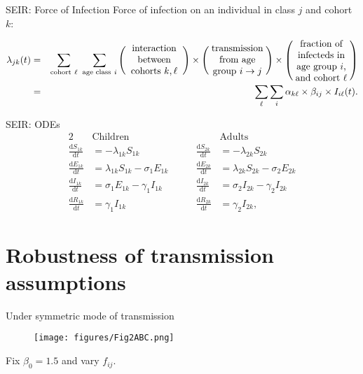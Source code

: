 \documentclass[8pt]{beamer}
\newcommand{\ddt}[1]{\frac{\mathrm{d}#1}{\mathrm{d}t}}
\begin{document}
\begin{frame}{SEIR: Force of Infection}
Force of infection on an individual in class $j$ and cohort $k$:

\begin{eqnarray*}
    \lambda_{jk}(t) &=&
    \sum_{\text{cohort}~\ell}~\sum_{\text{age class}~i}
    \left(\parbox{6em}{\centering interaction between cohorts $k,\ell$}\right)
    \times
    \left(\parbox{6em}{\centering transmission from age group $i \rightarrow j$}\right)
    \times
    \left(\parbox{6em}{\centering fraction of infecteds in age group $i$, and cohort $\ell$}\right) \\
    &=&
    \sum_{\ell} \sum_{i}
    \alpha_{k\ell}
    \times
    \beta_{ij}
    \times
    I_{i\ell}(t).
    \end{eqnarray*}
\end{frame}

\begin{frame}{SEIR: ODEs}
\begin{alignat*}{2}
    &\text{Children} &\qquad &\text{Adults} \\
    \ddt{S_{1k}} &= - \lambda_{1k} S_{1k}                   &\qquad
    \ddt{S_{2k}} &= - \lambda_{2k} S_{2k}                   \\
    \ddt{E_{1k}} &= \lambda_{1k} S_{1k} - \sigma_{1} E_{1k} &\qquad
    \ddt{E_{2k}} &= \lambda_{2k} S_{2k} - \sigma_{2} E_{2k} \\
    \ddt{I_{1k}} &= \sigma_{1} E_{1k} - \gamma_{1} I_{1k}   &\qquad
    \ddt{I_{2k}} &= \sigma_{2} I_{2k} - \gamma_{2} I_{2k}   \\
    \ddt{R_{1k}} &= \gamma_{1} I_{1k}                       &\qquad
    \ddt{R_{2k}} &= \gamma_{2} I_{2k},
\end{alignat*}
\end{frame}

\section{Robustness of transmission assumptions}

\begin{frame}{Under symmetric mode of transmission}
\begin{figure}
    \centering
    \texttt{[image: figures/Fig2ABC.png]}
\end{figure}

Fix $\beta_{0}=1.5$ and vary $f_{ij}$.
\end{frame}
\end{document}
